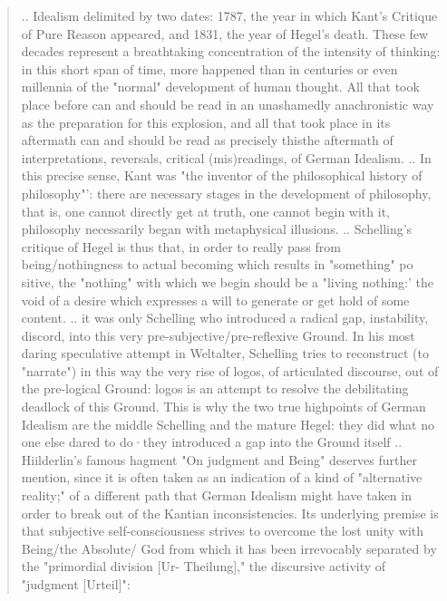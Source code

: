 \documentclass{book}
\begin{document}
\begin{quotation}
..
Idealism delimited by two dates: 1787, the year in which Kant's Critique of Pure Reason appeared, and 1831, the year of Hegel's death. These few decades repre­sent a breathtaking concentration of the intensity of thinking: in this short span of time, more happened than in centuries or even millennia of the "normal" development of human thought. All that took place before can and should be read in an unashamedly anachronistic way as the preparation for this explosion, and all that took place in its aftermath can and should be read as precisely this­the aftermath of interpretations, reversals, critical (mis)readings, of German Idealism.
..
In this precise sense, Kant was "the inventor of the philosophical history of philosophy"': there are necessary stages in the development of philosophy, that is, one cannot directly get at truth, one cannot begin with it, philosophy necessarily began with metaphysical illusions.
..
Schelling's critique of Hegel is thus that, in order to really pass from being/nothingness to actual becoming which results in "something" po sitive, the "nothing" with which we begin should be a "living nothing:' the void of a desire which expresses a will to generate or get hold of some content.
..
it was only Schelling who introduced a radical gap, instability, discord, into this very pre-subjective/pre-reflexive Ground. In his most daring speculative attempt in Weltalter, Schelling tries to reconstruct (to "narrate") in this way the very rise of logos, of articulated discourse, out of the pre-logical Ground: logos is an attempt to resolve the debilitating deadlock of this Ground. This is why the two true highpoints of German Idealism are the middle Schelling and the mature Hegel: they did what no one else dared to do·­they introduced a gap into the Ground itself
..
Hiilderlin's famous hagment "On judgment and Being" deserves further mention, since it is often taken as an indication of a kind of "alternative reality;" of a different path that German Idealism might have taken in order to break out of the Kantian inconsistencies. Its underlying premise is that subjective self-consciousness strives to overcome the lost unity with Being/the Absolute/ God from which it has been irrevocably separated by the "primordial division [Ur- Theilung]," the discursive activity of "judgment [Urteil]":


\end{quotation}
\end{document}
